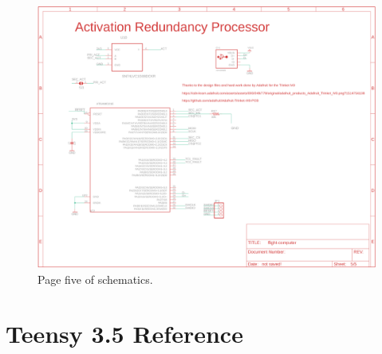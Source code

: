 \documentclass{article}
\begin{document}
\begin{figure}[H]
    \centering
    \includegraphics[width=\textwidth]{images/page5.png}
    \caption{Page five of schematics.}
    \label{fig:page1-5}
\end{figure}


\section{Teensy 3.5 Reference}
\end{document}

